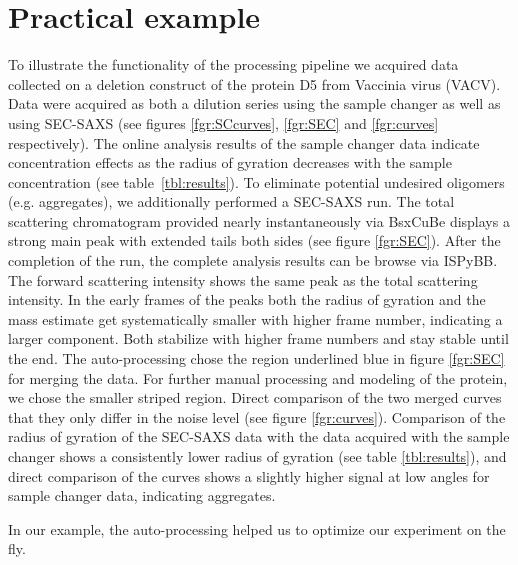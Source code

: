 \documentclass[preprint,pdf]{iucr}              %
\begin{document}
\section{Practical example}
To illustrate the functionality of the processing pipeline we acquired data collected
on a deletion construct of the protein D5 from  Vaccinia virus (VACV).
Data were acquired as both a dilution series using the sample changer as well as
using SEC-SAXS (see figures \ref{fgr:SCcurves}, \ref{fgr:SEC} and \ref{fgr:curves} respectively).
The online analysis results of the sample changer data indicate concentration effects
as the radius of gyration decreases with the  sample concentration (see table~\ref{tbl:results}).
To eliminate potential undesired oligomers (e.g. aggregates), we additionally performed a SEC-SAXS run.
The total scattering chromatogram provided nearly instantaneously via BsxCuBe displays a strong main
peak with extended tails both sides (see figure \ref{fgr:SEC}).
After the completion of the run, the complete analysis results can be browse via
ISPyBB.
The forward scattering intensity shows the same peak as the total scattering intensity.
In the early frames of the peaks both the radius of gyration and the mass estimate get systematically
smaller with higher frame number, indicating a larger component.
Both stabilize with higher frame numbers and stay stable until the end.
The auto-processing chose the region underlined blue in figure  \ref{fgr:SEC}
for merging the data.
For further manual processing and modeling of the protein, we chose the smaller
striped region.
Direct comparison of the two merged curves that they only differ in the noise level
(see figure \ref{fgr:curves}).
Comparison of the radius of gyration of the SEC-SAXS data with the data acquired with the sample
changer shows a consistently lower radius of gyration (see table \ref{tbl:results}), and direct
comparison of the curves shows a slightly higher signal at low angles for sample changer data,
indicating aggregates.

In our example, the auto-processing helped us to optimize our experiment on the fly.
\end{document}
